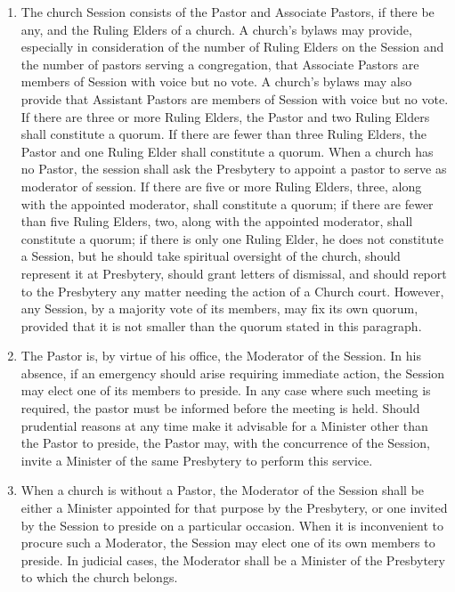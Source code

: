\documentclass[
]{book}
\providecommand{\tightlist}{%
  \setlength{\itemsep}{0pt}\setlength{\parskip}{0pt}}
\begin{document}
\begin{enumerate}
\def\labelenumi{\arabic{enumi}.}
\tightlist
\item
  \protect\hypertarget{14}{\href{}{}}The church Session consists of the Pastor and Associate Pastors, if there be any, and the Ruling Elders of a church. A church's bylaws may provide, especially in consideration of the number of Ruling Elders on the Session and the number of pastors serving a congregation, that Associate Pastors are members of Session with voice but no vote. A church's bylaws may also provide that Assistant Pastors are members of Session with voice but no vote. If there are three or more Ruling Elders, the Pastor and two Ruling Elders shall constitute a quorum. If there are fewer than three Ruling Elders, the Pastor and one Ruling Elder shall constitute a quorum. When a church has no Pastor, the session shall ask the Presbytery to appoint a pastor to serve as moderator of session. If there are five or more Ruling Elders, three, along with the appointed moderator, shall constitute a quorum; if there are fewer than five Ruling Elders, two, along with the appointed moderator, shall constitute a quorum; if there is only one Ruling Elder, he does not constitute a Session, but he should take spiritual oversight of the church, should represent it at Presbytery, should grant letters of dismissal, and should report to the Presbytery any matter needing the action of a Church court. However, any Session, by a majority vote of its members, may fix its own quorum, provided that it is not smaller than the quorum stated in this paragraph.
\item
  The Pastor is, by virtue of his office, the Moderator of the Session. In his absence, if an emergency should arise requiring immediate action, the Session may elect one of its members to preside. In any case where such meeting is required, the pastor must be informed before the meeting is held. Should prudential reasons at any time make it advisable for a Minister other than the Pastor to preside, the Pastor may, with the concurrence of the Session, invite a Minister of the same Presbytery to perform this service.
\item
  When a church is without a Pastor, the Moderator of the Session shall be either a Minister appointed for that purpose by the Presbytery, or one invited by the Session to preside on a particular occasion. When it is inconvenient to procure such a Moderator, the Session may elect one of its own members to preside. In judicial cases, the Moderator shall be a Minister of the Presbytery to which the church belongs.

\end{enumerate}
\end{document}
